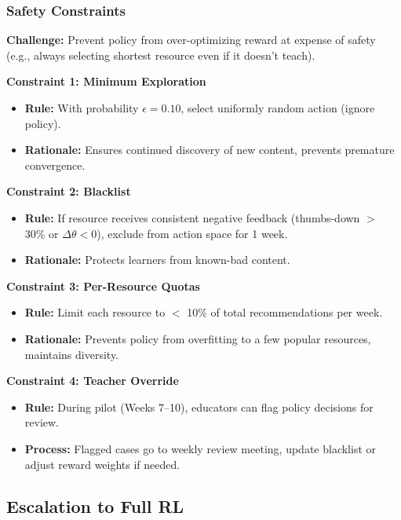 \documentclass[11pt,letterpaper]{article}
\begin{document}
\subsubsection{Safety Constraints}

\textbf{Challenge:} Prevent policy from over-optimizing reward at expense of safety (e.g., always selecting shortest resource even if it doesn't teach).

\textbf{Constraint 1: Minimum Exploration}
\begin{itemize}
\item \textbf{Rule:} With probability $\epsilon = 0.10$, select uniformly random action (ignore policy).
\item \textbf{Rationale:} Ensures continued discovery of new content, prevents premature convergence.
\end{itemize}

\textbf{Constraint 2: Blacklist}
\begin{itemize}
\item \textbf{Rule:} If resource receives consistent negative feedback (thumbs-down $>$ 30\% or $\Delta\theta < 0$), exclude from action space for 1 week.
\item \textbf{Rationale:} Protects learners from known-bad content.
\end{itemize}

\textbf{Constraint 3: Per-Resource Quotas}
\begin{itemize}
\item \textbf{Rule:} Limit each resource to $<$ 10\% of total recommendations per week.
\item \textbf{Rationale:} Prevents policy from overfitting to a few popular resources, maintains diversity.
\end{itemize}

\textbf{Constraint 4: Teacher Override}
\begin{itemize}
\item \textbf{Rule:} During pilot (Weeks 7--10), educators can flag policy decisions for review.
\item \textbf{Process:} Flagged cases go to weekly review meeting, update blacklist or adjust reward weights if needed.
\end{itemize}

\subsection{Escalation to Full RL}\label{subsec:escalation-full-rl}
\end{document}
